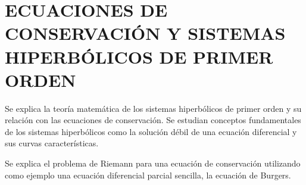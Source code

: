 \chapter{ECUACIONES DE CONSERVACIÓN Y SISTEMAS HIPERBÓLICOS DE PRIMER ORDEN}
Se explica la teoría matemática de los sistemas hiperbólicos de primer orden y su relación con las ecuaciones de conservación. Se estudian conceptos fundamentales de los sistemas hiperbólicos como la solución débil de una ecuación diferencial y sus curvas características.

Se explica el problema de Riemann para una ecuación de conservación utilizando como ejemplo una ecuación diferencial parcial sencilla, la ecuación de Burgers.
